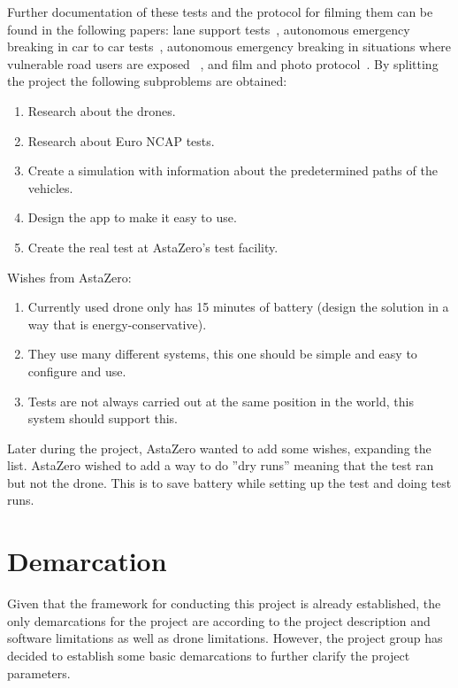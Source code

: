  Further documentation of these tests and the protocol for filming them can be found in the following papers: lane support tests~\cite{EuroNCAP2022EUROPEAN2023b}, autonomous emergency breaking in car to car tests~\cite{EuroNCAP2022EUROPEAN2023}, autonomous emergency breaking in situations where vulnerable road users are exposed ~\cite{EuroNCAP2022EUROPEANNCAPb}, and film and photo protocol~\cite{EuroNCAP2021EUROPEANPROTOCOL}. By splitting the project the following subproblems are obtained: 
\newline
    \begin{enumerate}
        \item Research about the drones.
        \item Research about Euro NCAP tests.
        \item Create a simulation with information about the predetermined paths of the vehicles.
        \item Design the app to make it easy to use.
        \item Create the real test at AstaZero's test facility.
    \end{enumerate}

Wishes from AstaZero:
\newline
    \begin{enumerate}
        \item Currently used drone only has 15 minutes of battery (design the solution in a way that is energy-conservative).
        \item They use many different systems, this one should be simple and easy to configure and use.
        \item Tests are not always carried out at the same position in the world, this system should support this.
    \end{enumerate}
Later during the project, AstaZero wanted to add some wishes, expanding the list. AstaZero wished to add a way to do ''dry runs'' meaning that the test ran but not the drone. This is to save battery while setting up the test and doing test runs.

\section{Demarcation} \label{chap:demarcation}
Given that the framework for conducting this project is already established, the only demarcations for the project are according to the project description and software limitations as well as drone limitations. However, the project group has decided to establish some basic demarcations to further clarify the project parameters. 

